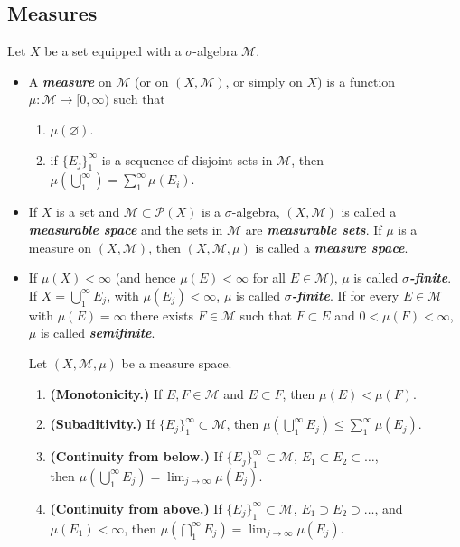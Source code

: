 \documentclass{article}
\theoremstyle{definition}
\begin{document}
	\subsection{Measures}
	Let $X$ be a set equipped with a $\sigma$-algebra $\mathcal{M}$.
	\begin{itemize}
		\item A \textbf{\textit{measure}} on $\mathcal{M}$ (or on $(X,\mathcal{M})$, or simply on $X$) is a function $\mu:\mathcal{M}\to [0,\infty)$ such that
		\begin{enumerate}
			\item $\mu(\varnothing)$.
			\item if $\{E_j\}_{1}^\infty$ is a sequence of disjoint sets in $\mathcal{M}$, then $\mu\left(\bigcup_{1}^\infty\right)=\sum_1^\infty\mu(E_i)$.
		\end{enumerate}
		\item If $X$ is a set and $\mathcal{M}\subset\mathcal{P}(X)$ is a $\sigma$-algebra, $(X,\mathcal{M})$ is called a \textbf{\textit{measurable space}} and the sets in $\mathcal{M}$ are \textbf{\textit{measurable sets}}. If $\mu$ is a measure on $(X,\mathcal{M})$, then $(X,\mathcal{M},\mu)$ is called a \textbf{\textit{measure space}}.
		\item If $\mu(X)<\infty$ (and hence $\mu(E)<\infty$ for all $E\in\mathcal{M}$), $\mu$ is called \textbf{\textit{$\sigma$-finite}}. If $X=\bigcup_{1}^\infty E_j$, with $\mu(E_j)<\infty$, $\mu$ is called \textbf{\textit{$\sigma$-finite}}. If for every $E\in\mathcal{M}$ with $\mu(E)=\infty$ there exists $F\in\mathcal{M}$ such that $F\subset E$ and $0<\mu(F)<\infty$, $\mu$ is called \textbf{\textit{semifinite}}.
		\begin{thm}
			Let $(X,\mathcal{M},\mu)$ be a measure space.
			\begin{enumerate}
				\item \textbf{(Monotonicity.)} If $E,F\in\mathcal{M}$ and $E\subset F$, then $\mu(E)<\mu(F)$.
				\item \textbf{(Subaditivity.)} If $\{E_j\}_{1}^\infty\subset\mathcal{M}$, then $\mu\left(\bigcup_{1}^\infty E_j\right)\leq\sum_1^\infty\mu(E_j)$.
				\item \textbf{(Continuity from below.)} If $\{E_j\}_1^\infty\subset\mathcal{M}$, $E_1\subset E_2\subset\ldots$,\\ then $\mu(\bigcup_1^\infty E_j)=\lim_{j\to\infty}\mu(E_j)$.
					\item \textbf{(Continuity from above.)} If $\{E_j\}_1^\infty\subset\mathcal{M}$, $E_1\supset E_2\supset\ldots$, and $\mu(E_1)<\infty$, then $\mu(\bigcap_1^\infty E_j)=\lim_{j\to\infty}\mu(E_j)$.

\end{enumerate}
\end{thm}
\end{itemize}
\end{document}

